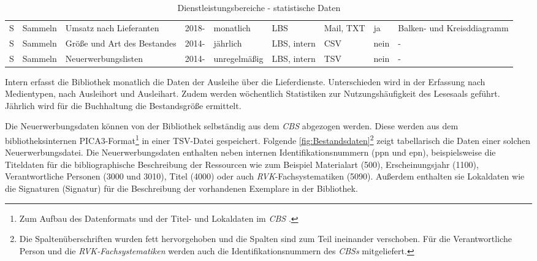 \begin{table}[H]
\begin{adjustbox}{max width=\textwidth}
\begin{tabular}{p{}p{}p{}p{}p{}p{}p{}p{}p{}}
            S         &Sammeln                       & Umsatz nach Lieferanten                     & 2018-               & monatlich         & LBS          & Mail, TXT                 & ja    & Balken- und Kreisddiagramm\\ 
            S         &Sammeln                       & Größe und Art des Bestandes                   & 2014-             & jährlich          & LBS, intern  & CSV                       & nein  & -\\ 
            S         &Sammeln                       & Neuerwerbungslisten                           & 2014-             & unregelmäßig         & LBS, intern  & TSV                       & nein  & -\\ 
            

        \bottomrule
    \end{tabular}
    \end{adjustbox}
    \caption{%
        Dienstleistungsbereiche - statistische Daten
    \label{tab:Statistische_Daten}
    }
     \end{table}

\endgroup


Intern erfasst die Bibliothek monatlich die Daten der Ausleihe über die Lieferdienste. Unterschieden 
wird in der Erfassung nach Medientypen, nach Ausleihort und Ausleihart. Zudem werden wöchentlich 
Statistiken zur Nutzungshäufigkeit des Lesesaals geführt. Jährlich wird für die Buchhaltung die Bestandsgröße ermittelt.

Die Neuerwerbungsdaten können von der Bibliothek selbständig aus dem \textit{\acrshort{CBS}} abgezogen werden. Diese werden aus
dem bibliotheksinternen PICA3-Format\footnote{ Zum Aufbau des Datenformats und der Titel- und Lokaldaten im \textit{\acrlong{CBS}} \cite[vgl.][4]{hebis_datenstruktur_2017}.}
in einer TSV-Datei gespeichert. Folgende \autoref{fig:Bestandsdaten}\footnote{Die Spaltenüberschriften wurden fett hervorgehoben
und die Spalten sind zum Teil ineinander verschoben. Für die Verantwortliche Person und die \textit{\acrshort{RVK}-Fachsystematiken}
werden auch die Identifikationsnummern des \textit{\acrlong{CBS}s} mitgeliefert.} zeigt tabellarisch
die Daten einer solchen Neuerwerbungsdatei.
Die Neuerwerbungsdaten enthalten neben internen Identifikationsnummern (ppn und epn), beispielsweise die Titeldaten für die bibliographische Beschreibung der Ressourcen wie 
zum Beispiel Materialart (500), Erscheinungsjahr (1100), Verantwortliche Personen (3000 und 3010), Titel (4000) oder auch \textit{\acrshort{RVK}}-Fachsystematiken (5090).
Außerdem enthalten sie Lokaldaten wie die Signaturen (Signatur) für die Beschreibung der vorhandenen Exemplare in der Bibliothek.

